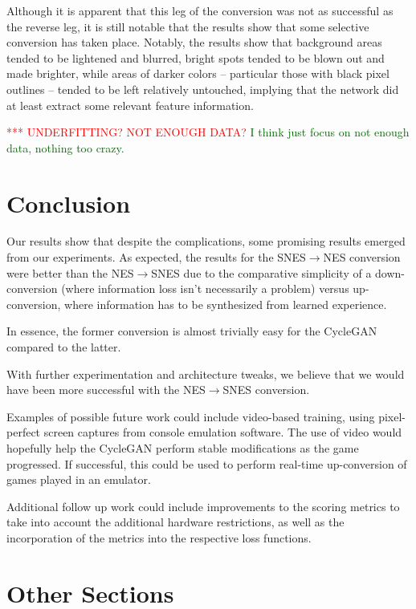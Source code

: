 \documentclass[10pt,twocolumn,letterpaper]{article}
\begin{document}
Although it is apparent that this leg of the conversion was not as successful as the reverse leg, it is still notable that the results show that some selective conversion has taken place. Notably, the results show that background areas tended to be lightened and blurred, bright spots tended to be blown out and made brighter, while areas of darker colors \--- particular those with black pixel outlines \--- tended to be left relatively untouched, implying that the network did at least extract some relevant feature information.

\textcolor{red}{*** UNDERFITTING? NOT ENOUGH DATA?}
\textcolor{darkgreen} {I think just focus on not enough data, nothing too crazy.}

\section{Conclusion}

Our results show that despite the complications, some promising results emerged from our experiments. As expected, the results for the SNES$\rightarrow$NES conversion were better than the NES$\rightarrow$SNES due to the comparative simplicity of a down-conversion (where information loss isn't necessarily a problem) versus up-conversion, where information has to be synthesized from learned experience.

In essence, the former conversion is almost trivially easy for the CycleGAN compared to the latter.

With further experimentation and architecture tweaks, we believe that we would have been more successful with the NES$\rightarrow$SNES conversion.

Examples of possible future work could include video-based training, using pixel-perfect screen captures from console emulation software. The use of video would hopefully help the CycleGAN perform stable modifications as the game progressed. If successful, this could be used to perform real-time up-conversion of games played in an emulator.

Additional follow up work could include improvements to the scoring metrics to take into account the additional hardware restrictions, as well as the incorporation of the metrics into the respective loss functions.

\section{Other Sections}
\end{document}
